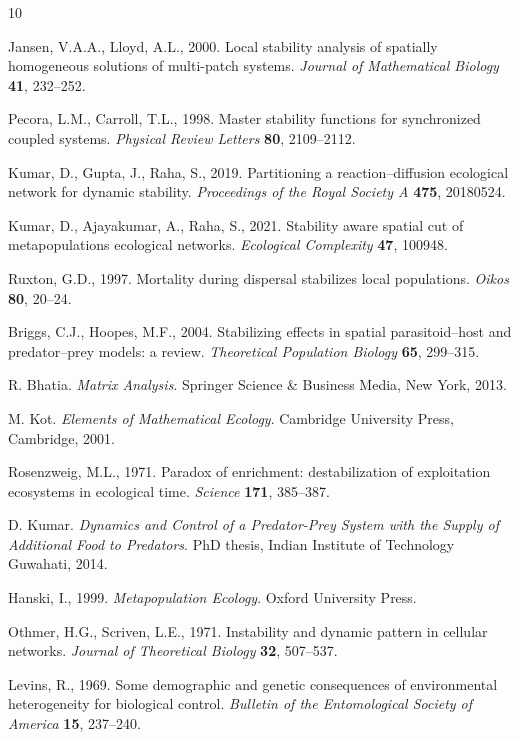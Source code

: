 \documentclass[12pt,a4paper]{article}
\theoremstyle{definition}
\begin{document}
\begin{thebibliography}{10}

Jansen, V.A.A., Lloyd, A.L., 2000. Local stability analysis of spatially homogeneous solutions of multi-patch systems. \emph{Journal of Mathematical Biology} \textbf{41}, 232--252.

Pecora, L.M., Carroll, T.L., 1998. Master stability functions for synchronized coupled systems. \emph{Physical Review Letters} \textbf{80}, 2109--2112.

Kumar, D., Gupta, J., Raha, S., 2019. Partitioning a reaction--diffusion ecological network for dynamic stability. \emph{Proceedings of the Royal Society A} \textbf{475}, 20180524.

Kumar, D., Ajayakumar, A., Raha, S., 2021. Stability aware spatial cut of metapopulations ecological networks. \emph{Ecological Complexity} \textbf{47}, 100948.

Ruxton, G.D., 1997. Mortality during dispersal stabilizes local populations. \emph{Oikos} \textbf{80}, 20--24.

Briggs, C.J., Hoopes, M.F., 2004. Stabilizing effects in spatial parasitoid--host and predator--prey models: a review. \emph{Theoretical Population Biology} \textbf{65}, 299--315.

R. Bhatia.
\newblock \emph{Matrix Analysis}.
\newblock Springer Science \& Business Media, New York, 2013.

M. Kot.
\newblock \emph{Elements of Mathematical Ecology}.
\newblock Cambridge University Press, Cambridge, 2001.

Rosenzweig, M.L., 1971. Paradox of enrichment: destabilization of exploitation ecosystems in ecological time. \emph{Science} \textbf{171},  385--387.

D. Kumar.
\newblock \emph{Dynamics and Control of a Predator-Prey System with the Supply of Additional Food to Predators}.
\newblock PhD thesis, Indian Institute of Technology Guwahati, 2014.


Hanski, I., 1999. \emph{Metapopulation Ecology}. Oxford University Press.

Othmer, H.G., Scriven, L.E., 1971. Instability and dynamic pattern in cellular networks. \emph{Journal of Theoretical Biology} \textbf{32}, 507--537.

Levins, R., 1969. Some demographic and genetic consequences of environmental heterogeneity for biological control. \emph{Bulletin of the Entomological Society of America} \textbf{15}, 237--240.

\end{thebibliography}
\end{document}

